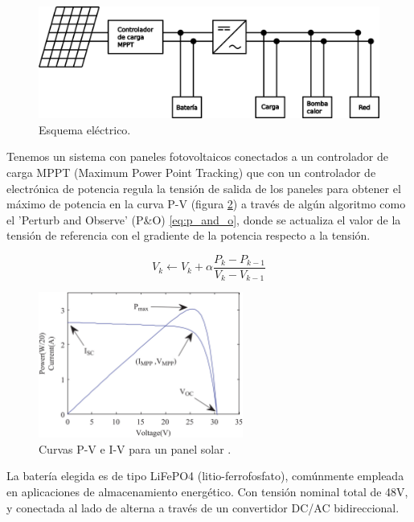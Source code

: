 \begin{figure}[h] \centering
	\centering
	\includegraphics[width=1\textwidth]{./capitulos/resultados_discusion/images/diagrama_electrico.png}
	\caption{Esquema eléctrico.}
	\label{fig:electic_diagram}
\end{figure}

Tenemos un sistema con paneles fotovoltaicos conectados a un controlador de
carga MPPT (Maximum Power Point Tracking) que con un controlador de electrónica
de potencia regula la tensión de salida de los paneles para obtener el máximo
de potencia en la curva P-V (figura \ref{fig:solar_P-V_I-V}) a través de algún
algoritmo como el 'Perturb and Observe' (P\&O) \eqref{eq:p_and_o}, donde se actualiza el valor de
la tensión de referencia con el gradiente de la potencia respecto a la tensión.

\begin{equation} \label{eq:p_and_o}
	V_{k} \leftarrow V_k + \alpha \frac{P_k - P_{k-1}}{V_{k}-V_{k-1}}
\end{equation}

\begin{figure}[h] \centering
	\centering
	\includegraphics[width=0.6\textwidth]{./capitulos/resultados_discusion/images/solar_P-V_I-V.jpg}
	\caption{Curvas P-V e I-V para un panel solar \cite{podder2019mppt}.}
	\label{fig:solar_P-V_I-V}
\end{figure}


La batería elegida es de tipo LiFePO4 (litio-ferrofosfato), comúnmente
empleada en aplicaciones de almacenamiento energético. Con tensión nominal
total de 48V, y conectada al lado de alterna a través de un convertidor
DC/AC bidireccional.

